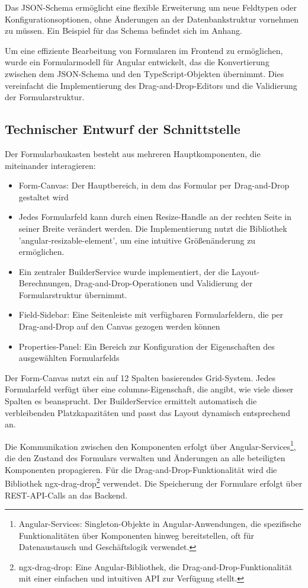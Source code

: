 \documentclass[a4paper,11pt]{article}
\begin{document}
\noindent Das JSON-Schema ermöglicht eine flexible Erweiterung um neue Feldtypen oder Konfigurationsoptionen, ohne Änderungen an der Datenbankstruktur vornehmen zu müssen. Ein Beispiel für das Schema befindet sich im Anhang.

\noindent Um eine effiziente Bearbeitung von Formularen im Frontend zu ermöglichen, wurde ein Formularmodell für Angular entwickelt, das die Konvertierung zwischen dem JSON-Schema und den TypeScript-Objekten übernimmt. Dies vereinfacht die Implementierung des Drag-and-Drop-Editors und die Validierung der Formularstruktur.


\subsection{Technischer Entwurf der Schnittstelle}
Der Formularbaukasten besteht aus mehreren Hauptkomponenten, die miteinander interagieren:

\begin{itemize}
  \item Form-Canvas: Der Hauptbereich, in dem das Formular per Drag-and-Drop gestaltet wird
  \item Jedes Formularfeld kann durch einen Resize-Handle an der rechten Seite in seiner Breite verändert werden. Die Implementierung nutzt die Bibliothek 'angular-resizable-element', um eine intuitive Größenänderung zu ermöglichen.
  \item Ein zentraler BuilderService wurde implementiert, der die Layout-Berechnungen, Drag-and-Drop-Operationen und Validierung der Formularstruktur übernimmt.
  \item Field-Sidebar: Eine Seitenleiste mit verfügbaren Formularfeldern, die per Drag-and-Drop auf den Canvas gezogen werden können
  \item Properties-Panel: Ein Bereich zur Konfiguration der Eigenschaften des ausgewählten Formularfelds
\end{itemize}

\noindent Der Form-Canvas nutzt ein auf 12 Spalten basierendes Grid-System. Jedes Formularfeld verfügt über eine columns-Eigenschaft, die angibt, wie viele dieser Spalten es beansprucht. Der BuilderService ermittelt automatisch die verbleibenden Platzkapazitäten und passt das Layout dynamisch entsprechend an.

\noindent Die Kommunikation zwischen den Komponenten erfolgt über Angular-Services\footnote{Angular-Services: Singleton-Objekte in Angular-Anwendungen, die spezifische Funktionalitäten über Komponenten hinweg bereitstellen, oft für Datenaustausch und Geschäftslogik verwendet.}, die den Zustand des Formulars verwalten und Änderungen an alle beteiligten Komponenten propagieren. Für die Drag-and-Drop-Funktionalität wird die Bibliothek ngx-drag-drop\footnote{ngx-drag-drop: Eine Angular-Bibliothek, die Drag-and-Drop-Funktionalität mit einer einfachen und intuitiven API zur Verfügung stellt.} verwendet.
\noindent Die Speicherung der Formulare erfolgt über REST-API-Calls an das Backend.
\end{document}
